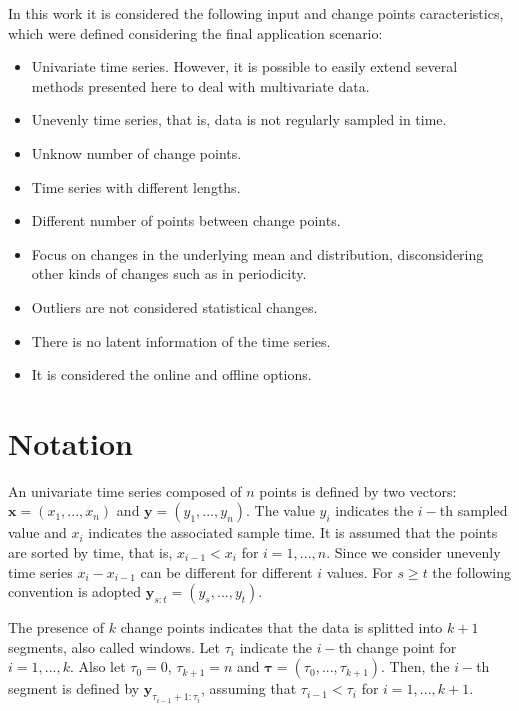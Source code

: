 In this work it is considered the following input and change points caracteristics, which were defined considering the final application scenario:
\begin{itemize}
    \item Univariate time series. However, it is possible to easily extend several methods presented here to deal with multivariate data.
    \item Unevenly time series, that is, data is not regularly sampled in time.
    \item Unknow number of change points.
    \item Time series with different lengths.
    \item Different number of points between change points.
    \item Focus on changes in the underlying mean and distribution, disconsidering other kinds of changes such as in periodicity.
    \item Outliers are not considered statistical changes.
    \item There is no latent information of the time series.
    \item It is considered the online and offline options.
\end{itemize}

\section{Notation}

An univariate time series composed of $n$ points is defined by two vectors: $\mathbf{x} = (x_{1}, ..., x_{n})$ and $\mathbf{y} = (y_{1}, ..., y_{n})$. The value $y_{i}$ indicates the $i-$th sampled value and $x_{i}$ indicates the associated sample time. It is assumed that the points are sorted by time, that is, $x_{i - 1} < x_{i}$ for $i = 1, ..., n$. Since we consider unevenly time series $x_{i} - x_{i - 1}$ can be different for different $i$ values. For $s \ge t$ the following convention is adopted $\mathbf{y}_{s:t} = (y_{s}, ..., y_{t})$.

The presence of $k$ change points indicates that the data is splitted into $k+1$ segments, also called windows. Let $\tau_{i}$ indicate the $i-$th change point for $i=1,...,k$. Also let $\tau_{0} = 0$, $\tau_{k + 1} = n$ and $\boldsymbol \tau = (\tau_{0}, ..., \tau_{k + 1})$. Then, the $i-$th segment is defined by $\mathbf{y}_{\tau_{i - 1} + 1 : \tau_{i}}$, assuming that $\tau_{i - 1} < \tau_{i}$ for $i = 1, ..., k + 1$.

